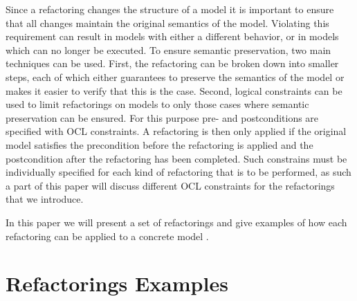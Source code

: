 \documentclass{llncs}
\begin{document}
Since a refactoring changes the structure of a model it is important to ensure that all changes maintain the original 
semantics of the model. Violating this requirement can result in models with either a different behavior, or in models 
which can no longer be executed. To ensure semantic preservation, two main techniques can be used. First, the refactoring 
can be broken down into smaller steps, each of which either guarantees to preserve the semantics of the model or makes it 
easier to verify that this is the case. Second, logical constraints can be used to limit refactorings on models to only 
those cases where semantic preservation can be ensured. For this purpose pre- and postconditions are specified with OCL 
constraints. A refactoring is then only applied if the original model satisfies the precondition before the refactoring is 
applied and the postcondition after the refactoring has been completed. Such constrains must be individually specified for 
each kind of refactoring that is to be performed, as such a part of this paper will discuss different OCL constraints for 
the refactorings that we introduce.

In this paper we will present a set of refactorings and give examples of how each refactoring can be applied to a concrete model 
.


\section{Refactorings Examples}
\label{refactoring-examples}
\end{document}
